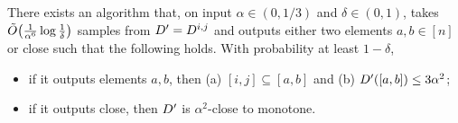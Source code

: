 \begin{lemma}\label{lemma:monotonicity:missingdata:step1}
There exists an algorithm that, on input $\alpha \in(0,1/3)$ and $\delta\in(0,1)$, takes $\tildeO{\frac{1}{\alpha^6}\log\frac{1}{\delta}}$ samples from $D^\prime=D^{i,j}$ and outputs either two elements $a,b\in[n]$ or \textsf{close} such that the following holds. With probability at least $1-\delta$, 
\begin{itemize}
  \item if it outputs elements $a,b$, then \textsf{(a)} $[i,j]\subseteq[a,b]$ and \textsf{(b)} $D^\prime([a,b]) \leq 3\alpha^2$;
  \item if it outputs \textsf{close}, then $D^\prime$ is $\alpha^2$-close to monotone.
\end{itemize}
\end{lemma}
